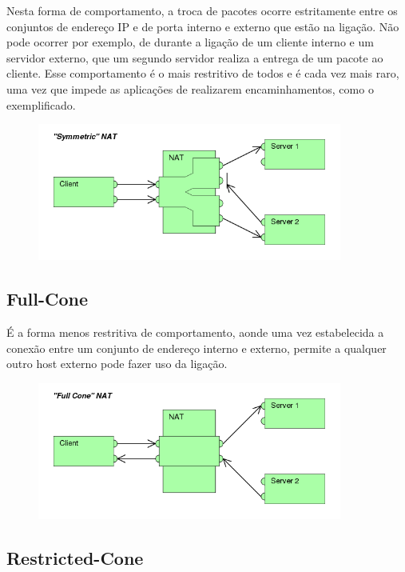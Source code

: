 \documentclass[
	12pt,				%
	oneside,			%
	a4paper,			%
	english,			%
	brazil,				%
	]{ime-abntex2}
\begin{document}
Nesta forma de comportamento, a troca de pacotes ocorre estritamente entre os conjuntos de endereço IP
e de porta interno e externo que estão na ligação. Não pode ocorrer por exemplo, de durante a ligação de um
cliente interno e um servidor externo, que um segundo servidor realiza a entrega de um pacote ao cliente.
Esse comportamento é o mais restritivo de todos e é cada vez mais raro, uma vez que impede as aplicações
de realizarem encaminhamentos, como o exemplificado.

\begin{figure}[ht]
\centering
\includegraphics[width=10cm]{imgs/600px-Symmetric_NAT}
\end{figure}

\subsection{Full-Cone}

É a forma menos restritiva de comportamento, aonde uma vez estabelecida a conexão entre um conjunto de endereço
interno e externo, permite a qualquer outro host externo pode fazer uso da ligação.

\begin{figure}[ht]
\centering
\includegraphics[width=10cm]{imgs/full_cone}
\end{figure}

\subsection{Restricted-Cone}
\end{document}
